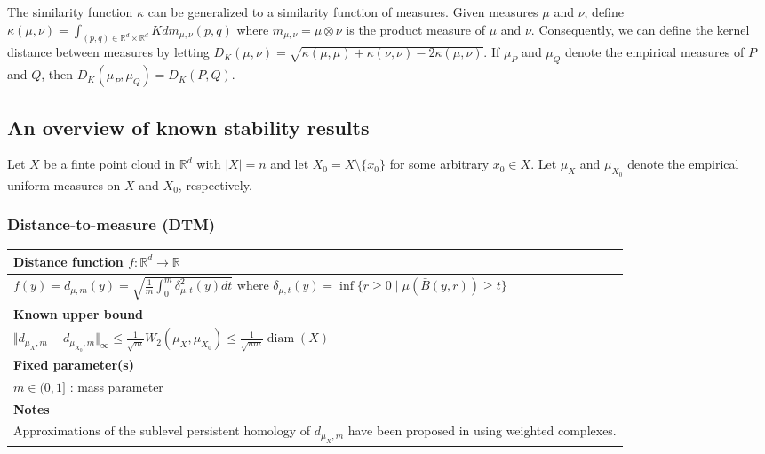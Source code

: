 \documentclass[10pt,a4paper]{article}
\theoremstyle{definition}
\newcommand{\R}{\mathbb{R}}
\begin{document}
The similarity function $\kappa$ can be generalized to a similarity function of measures. Given measures $\mu$ and $\nu$, define $\kappa(\mu,\nu)=\int_{(p,q)\in\R^d\times\R^d}Kdm_{\mu,\nu}(p,q)$ where $m_{\mu,\nu}=\mu\otimes\nu$ is the product measure of $\mu$ and $\nu$. Consequently, we can define the kernel distance between measures by letting $D_K(\mu,\nu) = \sqrt{\kappa(\mu,\mu)+\kappa(\nu,\nu)-2\kappa(\mu,\nu)}$. If $\mu_P$ and $\mu_Q$ denote the empirical measures of $P$ and $Q$, then $D_K(\mu_P, \mu_Q) = D_K(P,Q)$.


\subsection{An overview of known stability results}
Let $X$ be a finte point cloud in $\R^d$ with $|X|=n$ and let $X_0 = X\setminus\{x_0\}$ for some arbitrary $x_0\in X$. Let $\mu_X$ and $\mu_{X_0}$ denote the empirical uniform measures on $X$ and $X_0$, respectively.

\subsubsection{Distance-to-measure (DTM)}
\begin{tabularx}{\textwidth}{|X|}
	\hline
	\textbf{Distance function $f\colon\R^d\to\R$}  \\ \hline
	$
	f(y) = d_{\mu, m}(y) = \sqrt{\frac{1}{m}\int_0^m\delta^2_{\mu,t}(y)dt}
	\text{ where }
	\delta_{\mu, t}(y) = \inf\{r\geq0\mid\mu(\bar{B}(y,r))\geq t\}
	$
	\\ \hline
	\textbf{Known upper bound \autocite{Buchet2013}}  \\ \hline
	$\Vert d_{\mu_X,m} - d_{\mu_{X_0},m}\Vert_\infty \leq \frac{1}{\sqrt{m}}W_2(\mu_X,\mu_{X_0})\leq \frac{1}{\sqrt{nm}}\operatorname{diam}(X)$
	\\ \hline
	\textbf{Fixed parameter(s)} \\ \hline
	$m\in(0,1]$ : mass parameter
	\\ \hline
	\textbf{Notes}              \\ \hline
	Approximations of the sublevel persistent homology of $d_{\mu_X, m}$ have been proposed in \autocite{Anai2018} using weighted complexes.
	\\ \hline
\end{tabularx}
\end{document}
